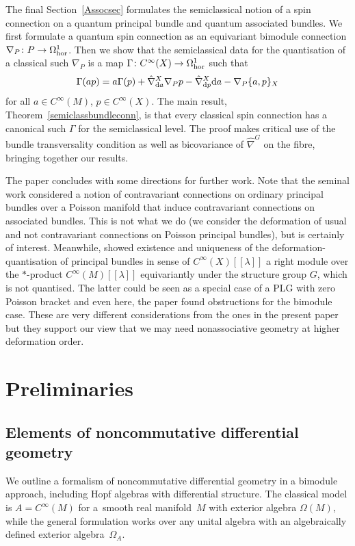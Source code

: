\documentclass[pdftex]{sigma}
\numberwithin{equation}{section}
\newcommand{\<}{{\langle}}
\renewcommand{\>}{{\rangle}}
\newcommand{\extd}{{\rm d}}
\begin{document}
The final Section~\ref{Assocsec} formulates the semiclassical notion of a spin connection on a quantum principal bundle and quantum associated bundles. We first formulate a quantum spin connection as an equivariant bimodule connection $\nabla_P\colon P\to \Omega^1_{\rm hor}$. Then we show that the semiclassical data for the quantisation of a classical such $\nabla_P$ is a map $\Gamma\colon C^\infty(X)\to \Omega^1_{\rm hor}$ such that
\[ \Gamma(ap)=a\Gamma(p)+ \hat\nabla^X_{\extd a}\nabla_P p-\hat\nabla^X_{\extd p}\extd a-\nabla_P\{a,p\}_X\]
for all $a\in C^\infty(M)$, $p\in C^\infty(X)$. The main result, Theorem~\ref{semiclassbundleconn}, is that every classical spin connection has a canonical such $\Gamma$ for the semiclassical level. The proof makes critical use of the bundle transversality condition as well as bicovariance of $\hat\nabla^G$ on the fibre, bringing together our results.

The paper concludes with some directions for further work. Note that the seminal work \cite{Fer} considered a notion of contravariant connections on ordinary principal bundles over a Poisson manifold that induce contravariant connections on associated bundles. This is not what we do (we consider the deformation of usual and not contravariant connections on Poisson principal bundles), but is certainly of interest. Meanwhile, \cite{Bor} showed existence and uniqueness of the deformation-quantisation of principal bundles in sense of $C^\infty(X)[[\lambda]]$ a right module over the $*$-product $C^\infty(M)[[\lambda]]$ equivariantly under the structure group $G$, which is not quantised. The latter could be seen as a special case of a PLG with zero Poisson bracket and even here, the paper found obstructions for the bimodule case. These are very different considerations from the ones in the present paper but they support our view that we may need nonassociative geometry at higher deformation order.

\section{Preliminaries}\label{secpre}

\subsection{Elements of noncommutative differential geometry}\label{Omega1}
We outline a formalism of noncommutative differential geometry in a bimodule approach, including Hopf algebras with differential structure. The classical model is $A=C^\infty(M)$ for a~smooth real manifold~$M$ with exterior algebra $\Omega(M)$, while the general formulation works over any unital algebra with an algebraically defined exterior algebra~$\Omega_A$.
\end{document}
